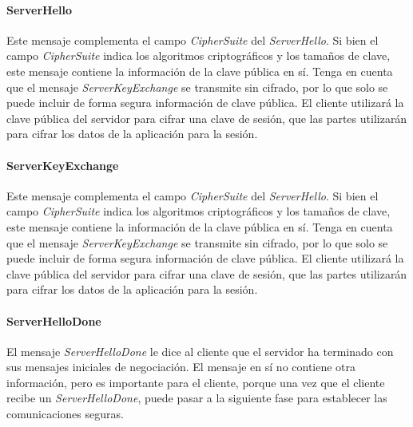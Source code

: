 \paragraph*{ServerHello}
Este mensaje complementa el campo \emph{CipherSuite} del \emph{ServerHello}. Si bien 
el campo \emph{CipherSuite} indica los algoritmos criptográficos y los tamaños 
de clave, este mensaje contiene la información de la clave pública en sí. 
Tenga en cuenta que el mensaje \emph{ServerKeyExchange} se transmite sin cifrado, 
por lo que solo se puede incluir de forma segura información de clave 
pública. El cliente utilizará la clave pública del servidor para cifrar 
una clave de sesión, que las partes utilizarán para cifrar los datos de 
la aplicación para la sesión.

\paragraph*{ServerKeyExchange}

Este mensaje complementa el campo \emph{CipherSuite} del \emph{ServerHello}. 
Si bien el campo \emph{CipherSuite} indica los algoritmos criptográficos y 
los tamaños de clave, este mensaje contiene la información de la clave 
pública en sí. Tenga en cuenta que el mensaje \emph{ServerKeyExchange} se 
transmite sin cifrado, por lo que solo se puede incluir de forma 
segura información de clave pública. El cliente utilizará la clave 
pública del servidor para cifrar una clave de sesión, que las partes 
utilizarán para cifrar los datos de la aplicación para la sesión.

\paragraph*{ServerHelloDone}
El mensaje \emph{ServerHelloDone} le dice al cliente que el servidor ha 
terminado con sus mensajes iniciales de negociación. El mensaje en 
sí no contiene otra información, pero es importante para el cliente, 
porque una vez que el cliente recibe un \emph{ServerHelloDone}, puede pasar a 
la siguiente fase para establecer las comunicaciones seguras.

